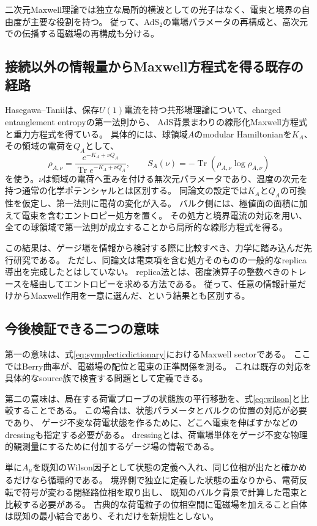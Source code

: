 \documentclass[a4paper,11pt]{ltjsarticle}
\numberwithin{equation}{section}
\newcommand{\Tr}{\operatorname{Tr}}
\begin{document}
二次元Maxwell理論では独立な局所的横波としての光子はなく、電束と境界の自由度が主要な役割を持つ。
従って、AdS$_2$の電場パラメータの再構成と、高次元での伝播する電磁場の再構成も分ける。

\subsection{接続以外の情報量からMaxwell方程式を得る既存の経路}
Hasegawa--Taniiは、保存$U(1)$電流を持つ共形場理論について、charged entanglement entropyの第一法則から、
AdS背景まわりの線形化Maxwell方程式と重力方程式を得ている\cite{HasegawaTanii}。
具体的には、球領域$A$のmodular Hamiltonianを$K_A$、その領域の電荷を$Q_A$として、
\begin{equation}
 \rho_{A,\nu}=\frac{e^{-K_A+\nu Q_A}}{\Tr e^{-K_A+\nu Q_A}},
 \qquad S_A(\nu)=-\Tr(\rho_{A,\nu}\log\rho_{A,\nu})
 \label{eq:chargedentropy}
\end{equation}
を使う。$\nu$は領域の電荷へ重みを付ける無次元パラメータであり、温度の次元を持つ通常の化学ポテンシャルとは区別する。
同論文の設定では$K_A$と$Q_A$の可換性を仮定し、第一法則に電荷の変化が入る。
バルク側には、極値面の面積に加えて電束を含むエントロピー処方を置く。
その処方と境界電流の対応を用い、全ての球領域で第一法則が成立することから局所的な線形方程式を得る。

この結果は、ゲージ場を情報から検討する際に比較すべき、力学に踏み込んだ先行研究である。
ただし、同論文は電束項を含む処方そのものの一般的なreplica導出を完成したとはしていない。
replica法とは、密度演算子の整数べきのトレースを経由してエントロピーを求める方法である。
従って、任意の情報計量だけからMaxwell作用を一意に選んだ、という結果とも区別する。

\subsection{今後検証できる二つの意味}
第一の意味は、式\eqref{eq:symplecticdictionary}におけるMaxwell sectorである。
ここではBerry曲率が、電磁場の配位と電束の正準関係を測る。
これは既存の対応を具体的なsource族で検査する問題として定義できる。

第二の意味は、局在する荷電プローブの状態族の平行移動を、式\eqref{eq:wilson}と比較することである。
この場合は、状態パラメータとバルクの位置の対応が必要であり、
ゲージ不変な荷電状態を作るために、どこへ電束を伸ばすかなどのdressingも指定する必要がある。
dressingとは、荷電場単体をゲージ不変な物理的観測量にするために付加するゲージ場の情報である。

単に$A_\mu$を既知のWilson因子として状態の定義へ入れ、同じ位相が出たと確かめるだけなら循環的である。
境界側で独立に定義した状態の重なりから、電荷反転で符号が変わる閉経路位相を取り出し、
既知のバルク背景で計算した電束と比較する必要がある。
古典的な荷電粒子の位相空間に電磁場を加えること自体は既知の最小結合であり、それだけを新規性としない。
\end{document}
